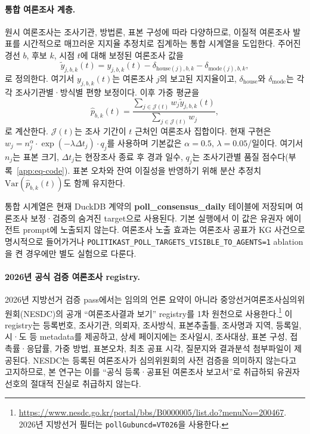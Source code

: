 \documentclass[11pt]{article}
\begin{document}
\paragraph{통합 여론조사 계층.} 원시 여론조사는 조사기관, 방법론, 표본 구성에 따라 다양하므로, 이질적 여론조사 발표를 시간적으로 매끄러운 지지율 추정치로 집계하는 통합 시계열을 도입한다. 주어진 경선 $b$, 후보 $k$, 시점 $t$에 대해 보정된 여론조사 값을
\begin{equation}
\tilde y_{j,b,k}(t) = y_{j,b,k}(t) - \delta_{\text{house}(j),b,k} - \delta_{\text{mode}(j),b,k},
\end{equation}
로 정의한다. 여기서 $y_{j,b,k}(t)$는 여론조사 $j$의 보고된 지지율이고, $\delta_{\text{house}}$와 $\delta_{\text{mode}}$는 각각 조사기관별·방식별 편향 보정이다. 이후 가중 평균을
\begin{equation}
\hat p_{b,k}(t) = \frac{\sum_{j \in \mathcal{J}(t)} w_j \tilde y_{j,b,k}(t)}{\sum_{j \in \mathcal{J}(t)} w_j},
\end{equation}
로 계산한다. $\mathcal{J}(t)$는 조사 기간이 $t$ 근처인 여론조사 집합이다. 현재 구현은 $w_j = n_j^{\alpha} \cdot \exp(-\lambda \Delta t_j) \cdot q_j$를 사용하며 기본값은 $\alpha = 0.5$, $\lambda = 0.05$/일이다. 여기서 $n_j$는 표본 크기, $\Delta t_j$는 현장조사 종료 후 경과 일수, $q_j$는 조사기관별 품질 점수다(부록~\ref{app:eq-code}). 표본 오차와 잔여 이질성을 반영하기 위해 분산 추정치 $\mathrm{Var}(\hat p_{b,k}(t))$도 함께 유지한다.

통합 시계열은 현재 DuckDB 계약의 \textbf{poll\_consensus\_daily} 테이블에 저장되며 여론조사 보정·검증의 숨겨진 target으로 사용된다. 기본 실행에서 이 값은 유권자 에이전트 prompt에 노출되지 않는다. 여론조사 노출 효과는 여론조사 공표가 KG 사건으로 명시적으로 들어가거나 \texttt{POLITIKAST\_POLL\_TARGETS\_VISIBLE\_TO\_AGENTS=1} ablation을 켠 경우에만 별도 실험으로 다룬다.

\paragraph{2026년 공식 검증 여론조사 registry.} 2026년 지방선거 검증 pass에서는 임의의 언론 요약이 아니라 중앙선거여론조사심의위원회(NESDC)의 공개 ``여론조사결과 보기'' registry를 1차 원천으로 사용한다.\footnote{\url{https://www.nesdc.go.kr/portal/bbs/B0000005/list.do?menuNo=200467}. 2026년 지방선거 필터는 \texttt{pollGubuncd=VT026}을 사용한다.} 이 registry는 등록번호, 조사기관, 의뢰자, 조사방식, 표본추출틀, 조사명과 지역, 등록일, 시·도 등 metadata를 제공하고, 상세 페이지에는 조사일시, 조사대상, 표본 구성, 접촉률·응답률, 가중 방법, 표본오차, 최초 공표 시각, 질문지와 결과분석 첨부파일이 제공된다. NESDC는 등록된 여론조사가 심의위원회의 사전 검증을 의미하지 않는다고 고지하므로, 본 연구는 이를 ``공식 등록·공표된 여론조사 보고서''로 취급하되 유권자 선호의 절대적 진실로 취급하지 않는다.
\end{document}
